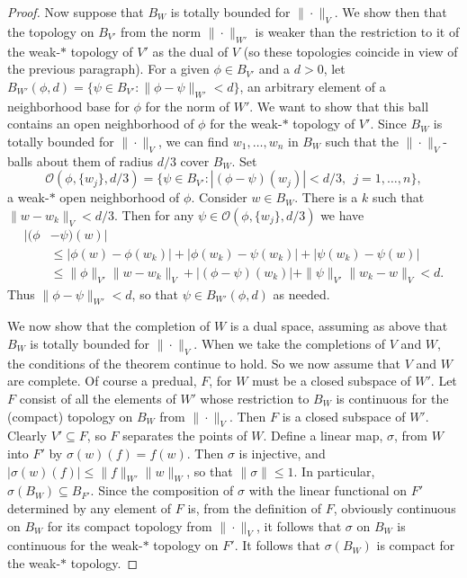 \documentclass{amsart}[14pt]
\theoremstyle{definition}
\theoremstyle{remark}
\newcommand{\cO}{{\mathcal O}}
\newcommand{\s}{\sigma}
\newcommand{\<}{\langle}
\renewcommand{\>}{\rangle}
\numberwithin{equation}{section}
\begin{document}
{\begin{proof}
Now suppose that $B_W$ is totally bounded for $\|\cdot\|_V$. We show then that 
 the topology on $B_{V'}$ from the norm $\|\cdot\|_{W'}$ is weaker than
 the restriction to it of the weak-$*$ topology of $V'$ as the
dual of $V$ (so these topologies coincide in view of the previous paragraph).
For a given $\phi \in  B_{V'}$ and a $d > 0$, let 
$B_{W'}(\phi, d) = \{\psi \in  B_{V'}: \|\phi - \psi\|_{W'} < d\}$,  
 an arbitrary element of a neighborhood base for $\phi$ for the norm of $W'$.
 We want to show that this ball contains an open neighborhood of $\phi$
 for the weak-$*$ topology of $V'$. Since $B_W$ is totally bounded for $\|\cdot\|_V$,
 we can find $w_1, \dots, w_n$ in $B_W$ such that the $\|\cdot \|_V$-balls
 about them of
 radius $d/3$ cover $B_W$. Set
 \[
\cO(\phi, \{w_j\}, d/3) =\{\psi \in  B_{V'}: |(\phi - \psi)(w_j)| < d/3, \ \ j = 1, \dots , n\}  ,
\]
a weak-$*$ open neighborhood of $\phi$. Consider $w \in B_W$. There is
a $k$ such that $\|w - w_k\|_V < d/3$. Then for any $\psi \in \cO(\phi, \{w_j\}, d/3)$
we have
\begin{align*}
|(\phi & - \psi)(w)| \\
&\leq |\phi(w) - \phi(w_k)| + |\phi(w_k) - \psi(w_k)| + |\psi(w_k) - \psi(w)|  \\
&\leq \|\phi\|_{V'}\|w - w_k\|_V +  |(\phi - \psi)(w_k)| + \|\psi\|_{V'}\|w_k - w\|_V    < d   .
\end{align*}
Thus $\|\phi - \psi\|_{W'} < d$, so that $\psi \in B_{W'}(\phi, d)$ as needed.

We now show that the completion of $W$ is a dual space, assuming as above
that $B_W$ is totally bounded for $\|\cdot\|_V$. 
When we take the completions of $V$ and $W$, the conditions of the theorem
continue to hold. So we now assume that $V$ and $W$ are complete.
Of course a predual, $F$, for $W$ must
be a closed subspace of $W'$. Let $F$ consist of all the elements of $W'$
whose restriction to $B_W$ is continuous for the (compact) topology on $B_W$ 
from $\|\cdot\|_V$. Then $F$ is a closed subspace of $W'$.
Clearly $V' \subseteq F$, so $F$ separates the points of $W$. Define a linear
map, $\s$,  from $W$ into $F'$ by $\s(w)(f) = f(w)$. Then $\s$ is injective, and
$|\s(w)(f)| \leq \|f\|_{W'}\|w\|_W$, so that $\|\s\| \leq 1$. 
In particular, $\s(B_W) \subseteq B_{F'}$. Since the composition of $\s$
with the linear functional on $F'$ determined by any element of $F$ is, from the 
definition of $F$, obviously
 continuous on $B_W$ for its compact topology from $\|\cdot\|_V$, it follows that $\s$ 
 on $B_W$ is continuous
 for the weak-$*$ topology on $F'$. It follows that $\s(B_W)$ is compact for the
 weak-$*$ topology. 
 

\end{proof}}
\end{document}
